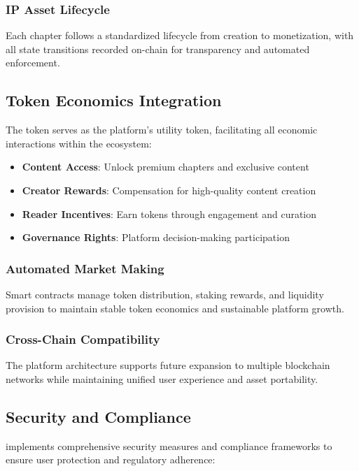 \subsubsection{IP Asset Lifecycle}

Each chapter follows a standardized lifecycle from creation to monetization, with all state transitions recorded on-chain for transparency and automated enforcement.

\subsection{Token Economics Integration}

The \tip{} token serves as the platform's utility token, facilitating all economic interactions within the ecosystem:

\begin{itemize}
    \item \textbf{Content Access}: Unlock premium chapters and exclusive content
    \item \textbf{Creator Rewards}: Compensation for high-quality content creation
    \item \textbf{Reader Incentives}: Earn tokens through engagement and curation
    \item \textbf{Governance Rights}: Platform decision-making participation
\end{itemize}

\subsubsection{Automated Market Making}

Smart contracts manage token distribution, staking rewards, and liquidity provision to maintain stable token economics and sustainable platform growth.

\subsubsection{Cross-Chain Compatibility}

The platform architecture supports future expansion to multiple blockchain networks while maintaining unified user experience and asset portability.

\subsection{Security and Compliance}

\storyhouse{} implements comprehensive security measures and compliance frameworks to ensure user protection and regulatory adherence:

